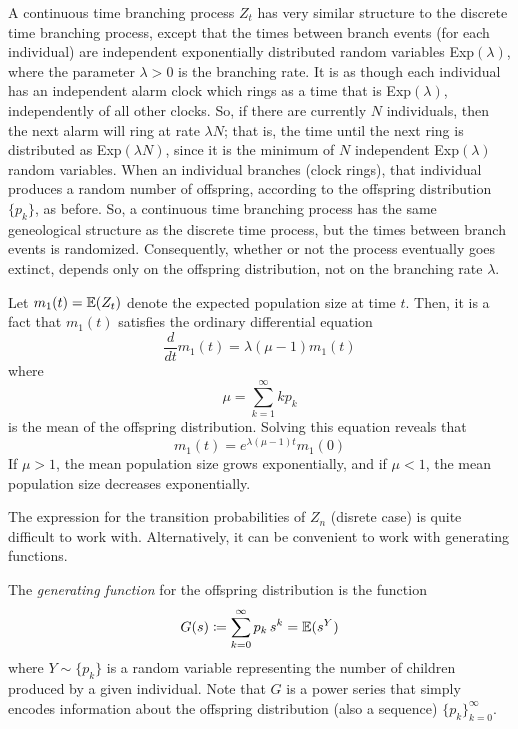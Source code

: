 	A continuous time branching process $Z_t$ has very similar structure to the discrete time branching process, except that the times between branch events (for each individual) are independent exponentially distributed random variables Exp$(\lambda)$, where the parameter $\lambda> 0$ is the branching rate. It is as though each individual has an independent alarm clock which rings as a time that is Exp$(\lambda)$, independently of all other clocks. So, if there are currently $N$ individuals, then the next alarm will ring at rate $\lambda N$; that is, the time until the next ring is distributed as Exp$(\lambda N)$, since it is the minimum of $N$ independent Exp$(\lambda)$ random variables. When an individual branches (clock rings), that individual produces a random number of offspring, according to the offspring distribution $\{p_k\}$, as before. So, a continuous time branching process has the same geneological structure as the discrete time process, but the times between branch events is randomized. Consequently, whether or not the process eventually goes extinct, depends only on the offspring distribution, not on the branching rate $\lambda$. 

	Let $m_1(t) = \operatorname{\mathbb{E}}(Z_t)$ denote the expected population size at time $t$. Then, it is a fact that $m_1(t)$ satisfies the ordinary differential equation
	\begin{equation}
		\frac{d}{d t} m_1 (t) = \lambda(\mu - 1) m_1 (t)
	\end{equation}
	where 
	\begin{equation}
		\mu = \sum_{k=1}^\infty k p_k
	\end{equation}
	is the mean of the offspring distribution. Solving this equation reveals that 
	\begin{equation}
		m_1 (t) = e^{\lambda (\mu-1) t} m_1 (0)
	\end{equation}
	If $\mu > 1$, the mean population size grows exponentially, and if $\mu < 1$, the mean population size decreases exponentially. 


	The expression for the transition probabilities of $Z_n$ (disrete case) is quite difficult to work with. Alternatively, it can be convenient to work with generating functions. 

	\begin{definition}
		\label{def:generating-function}
		The \textit{generating function} for the offspring distribution is the function 
		\begin{equation}
			G(s) \coloneqq \sum_{k=0}^\infty p_k \, s^k = \operatorname{\mathbb{E}}(s^Y)
		\end{equation}
		where $Y \sim \{p_k\}$ is a random variable representing the number of children produced by a given individual. Note that $G$ is a power series that simply encodes information about the offspring distribution (also a sequence) $\{p_k\}_{k=0}^\infty$. 
	\end{definition}

